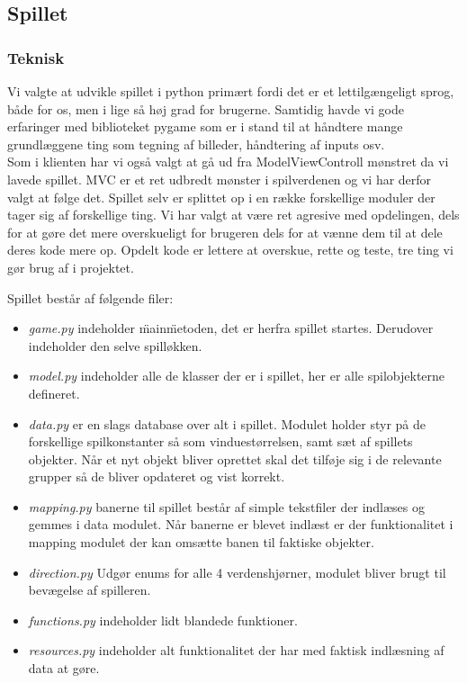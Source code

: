 \documentclass[10pt,a4paper,danish]{article}
\begin{document}
\subsection{Spillet}
\subsubsection{Teknisk}
Vi valgte at udvikle spillet i python primært fordi det er et lettilgængeligt sprog, både for os, men i lige så høj grad for brugerne. Samtidig havde vi gode erfaringer med biblioteket pygame som er i stand til at håndtere mange grundlæggene ting som tegning af billeder, håndtering af inputs osv.
\\

Som i klienten har vi også valgt at gå ud fra ModelViewControll mønstret da vi lavede spillet. MVC er et ret udbredt mønster i spilverdenen og vi har derfor valgt at følge det. 
Spillet selv er splittet op i en række forskellige moduler der tager sig af forskellige ting. Vi har valgt at være ret agresive med opdelingen, dels for at gøre det mere overskueligt for brugeren dels for at vænne dem til at dele deres kode mere op. Opdelt kode er lettere at overskue, rette og teste, tre ting vi gør brug af i projektet.

Spillet består af følgende filer:
\begin{itemize}
\item \textit{game.py} indeholder \"main\" metoden, det er herfra spillet startes. Derudover indeholder den selve spilløkken.
\item \textit{model.py} indeholder alle de klasser der er i spillet, her er alle spilobjekterne defineret.
\item \textit{data.py} er en slags database over alt i spillet. Modulet holder styr på de forskellige spilkonstanter så som vinduestørrelsen, samt sæt af spillets objekter. Når et nyt objekt bliver oprettet skal det tilføje sig i de relevante grupper så de bliver opdateret og vist korrekt.
\item \textit{mapping.py} banerne til spillet består af simple tekstfiler der indlæses og gemmes i data modulet. Når banerne er blevet indlæst er der funktionalitet i mapping modulet der kan omsætte banen til faktiske objekter.
\item \textit{direction.py} Udgør enums for alle 4 verdenshjørner, modulet bliver brugt til bevægelse af spilleren.
\item \textit{functions.py} indeholder lidt blandede funktioner.
\item \textit{resources.py} indeholder alt funktionalitet der har med faktisk indlæsning af data at gøre.
\end{itemize}
\end{document}
